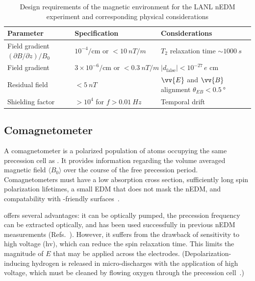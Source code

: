 \begin{table}
\centering
\caption{Design requirements of the magnetic environment for the LANL nEDM experiment and corresponding physical considerations}\label{tb:lanl_magnetic_design}
\begin{tabular}{
    lll
}
\toprule
Parameter		& Specification				& Considerations	\\
\midrule
Field gradient $(\partial B/\partial z)/B_0$	& $10^{-4}/\text{cm or } <\qty{10}{nT\per m}$ & $T_2$ relaxation time $\sim\qty{1000}{s}$\\
Field gradient  & $3\times 10^{-6}/\text{cm or }<\qty{0.3}{nT\per m}$ & $|d_\text{false}|<10^{-27}\,e\text{ cm}$ \\
Residual field & $<\qty{5}{nT}$ & $\vv{E}$ and $\vv{B}$ alignment $\theta_{EB}<\qty{0.5}{\degree}$ \\
Shielding factor & $>10^4$ for $f>\qty{0.01}{Hz}$ & Temporal drift \\
\bottomrule
\end{tabular}
\end{table}


\subsection
{
    \texorpdfstring{\hg Comagnetometer}
                    {199Hg Comagnetometer}\label{sec:199hg_comag}
}


A comagnetometer is a polarized population of atoms occupying the same precession cell as \ucn. It provides information regarding the volume averaged magnetic field $\langle B_0 \rangle$ over the course of the free precession period. Comagnetometers must have a low \ucn absorption cross section, sufficiently long spin polarization lifetimes, a small EDM that does not mask the nEDM, and compatability with \ucn-friendly surfaces~\cite{golubUCN}.

\hg offers several advantages: it can be optically pumped, the precession frequency can be extracted optically, and has been used successfully in previous nEDM measurements (Refs.~\cite{BAK06, ABE20}). However, it suffers from the drawback of sensitivity to high voltage (\acrshort*{hv}), which can reduce the spin relaxation time. This limits the magnitude of $E$ that may be applied across the electrodes. (Depolarization-inducing hydrogen is released in micro-discharges with the application of high voltage, which must be cleaned by flowing oxygen through the precession cell~\cite{baker_apparatus_2014}.)

